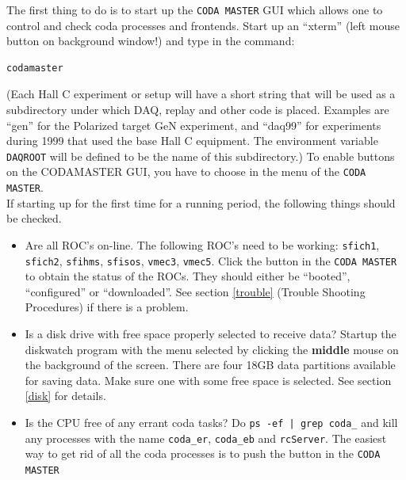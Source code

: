 The first thing to do is to start up the \verb|CODA MASTER| GUI
which allows one to 
control and check coda processes and frontends.
Start up an ``xterm'' (left mouse button on background window!) 
and type in the command:
\begin{verbatim}
codamaster
\end{verbatim}
(Each Hall C experiment or setup will have a short string that will be
used as a subdirectory under which DAQ, replay and other code is placed.
Examples are ``gen'' for the Polarized target GeN experiment, and ``daq99''
for experiments during 1999 that used the base Hall C equipment.
The environment variable \verb|DAQROOT| will be defined to be the name of
this subdirectory.)
To enable buttons on the CODAMASTER GUI, you have to choose 
in the  menu of the \verb|CODA MASTER|.\\  

If starting up for the first time for a running period, the following
things should be checked.
\begin{itemize}
\item Are all ROC's on-line.  The following ROC's need
to be working: 
\verb|sfich1|, \verb|sfich2|, \verb|sfihms|,
\verb|sfisos|,
\verb|vmec3|,
\verb|vmec5|.
Click the  button in the 
\verb|CODA MASTER| to obtain the status of the ROCs. They should either be 
``booted'', ``configured'' or ``downloaded''. See section \ref{trouble} 
(Trouble Shooting Procedures) if there is a problem.
\item Is a disk drive with free space properly selected to receive data?
Startup the diskwatch program with the menu selected by clicking the
{\bf middle} mouse on the background of the screen.  There are four 18GB data
partitions available for saving data.  Make sure one with some free space is
selected. See section \ref{disk} for details.
\item Is the CPU free of any errant coda tasks? Do
\verb+ps -ef | grep coda_+ and kill any processes with the name
\verb|coda_er|, \verb|coda_eb| and \verb|rcServer|.
The easiest way to get rid of all the coda processes is to push the
 button in the \verb|CODA MASTER|
\end{itemize}

